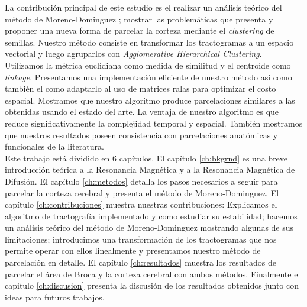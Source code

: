 La contribuci\'on principal de este estudio es el realizar un an\'alisis
te\'orico del m\'etodo de Moreno-Dominguez \cite{Moreno-Dominguez2014};
mostrar las problem\'aticas que presenta y proponer una nueva forma de
parcelar la corteza mediante el \textit{clustering} de semillas. Nuestro 
m\'etodo consiste en transformar los tractogramas a un espacio vectorial
y luego agruparlos con \textit{Agglomerative Hierarchical Clustering}. Utilizamos la m\'etrica euclidiana como medida de similitud y el centroide
como \textit{linkage}. Presentamos una implementaci\'on eficiente de
nuestro m\'etodo as\'i como tambi\'en el como adaptarlo al uso de matrices
ralas para optimizar el costo espacial. Mostramos que nuestro algoritmo
produce parcelaciones similares a las obtenidas usando el estado
del arte. La ventaja de nuestro algoritmo es que reduce significativamente
la complejidad temporal y espacial. Tambi\'en mostramos que
nuestros resultados poseen consistencia con parcelaciones anat\'omicas
\cite{Desikan2006} y funcionales \cite{Barch2013, Penfield1954} de la
literatura.  \\

Este trabajo est\'a dividido en 6 cap\'itulos. El cap\'itulo 
\ref{ch:bkgrnd} es una breve introducci\'on te\'orica a la Resonancia 
Magn\'etica y a la Resonancia Magn\'etica de Difusi\'on. El cap\'itulo
\ref{ch:metodos} detalla los pasos necesarios a seguir para parcelar la
corteza cerebral y presenta el m\'etodo de Moreno-Dominguez. El cap\'itulo
\ref{ch:contribuciones} muestra nuestras contribuciones: Explicamos el
algoritmo de tractograf\'ia implementado y como estudiar su estabilidad;
hacemos un an\'alisis te\'orico del m\'etodo de Moreno-Dominguez 
mostrando algunas de sus limitaciones; introducimos una transformaci\'on 
de los tractogramas que nos permite operar con ellos linealmente y
presentamos nuestro m\'etodo de parcelaci\'on en
detalle. El cap\'itulo \ref{ch:resultados} muestra los resultados de
parcelar el \'area de Broca y la corteza cerebral con ambos m\'etodos.
Finalmente el capitulo \ref{ch:discusion} presenta la discusi\'on de los
resultados obtenidos junto con ideas para futuros trabajos.
